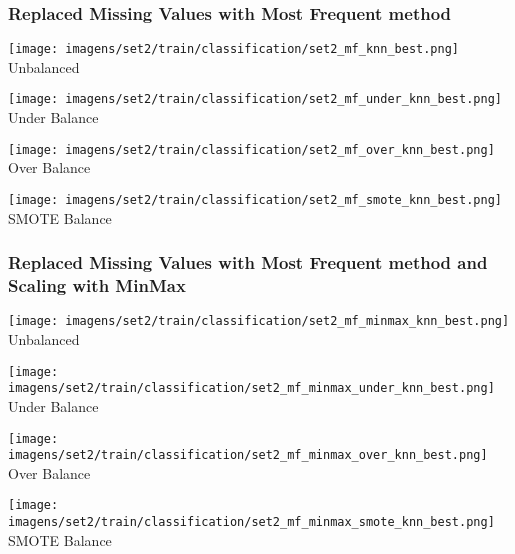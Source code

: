 \documentclass[11pt]{article}
\begin{document}
\subsubsection*{Replaced Missing Values with Most Frequent method}

\begin{figure*}[!htp]
    \begin{minipage}[!htp]{.25\textwidth}
        \centering
        \texttt{[image: imagens/set2/train/classification/set2\_mf\_knn\_best.png]}
        Unbalanced
    \end{minipage}\hfill
    \begin{minipage}[!htp]{.25\textwidth}
        \centering
        \texttt{[image: imagens/set2/train/classification/set2\_mf\_under\_knn\_best.png]}
        Under Balance
    \end{minipage}\hfill
    \begin{minipage}[!htp]{.25\textwidth}
        \centering
        \texttt{[image: imagens/set2/train/classification/set2\_mf\_over\_knn\_best.png]}
        Over Balance
    \end{minipage}\hfill
    \begin{minipage}[!htp]{.25\textwidth}
        \centering
        \texttt{[image: imagens/set2/train/classification/set2\_mf\_smote\_knn\_best.png]}
        SMOTE Balance
    \end{minipage}
\end{figure*}

\subsubsection*{Replaced Missing Values with Most Frequent method and Scaling with MinMax}

\begin{figure*}[!htp]
    \begin{minipage}[!htp]{.25\textwidth}
        \centering
        \texttt{[image: imagens/set2/train/classification/set2\_mf\_minmax\_knn\_best.png]}
        Unbalanced
    \end{minipage}\hfill
    \begin{minipage}[!htp]{.25\textwidth}
        \centering
        \texttt{[image: imagens/set2/train/classification/set2\_mf\_minmax\_under\_knn\_best.png]}
        Under Balance
    \end{minipage}\hfill
    \begin{minipage}[!htp]{.25\textwidth}
        \centering
        \texttt{[image: imagens/set2/train/classification/set2\_mf\_minmax\_over\_knn\_best.png]}
        Over Balance
    \end{minipage}\hfill
    \begin{minipage}[!htp]{.25\textwidth}
        \centering
        \texttt{[image: imagens/set2/train/classification/set2\_mf\_minmax\_smote\_knn\_best.png]}
        SMOTE Balance
    \end{minipage}
\end{figure*}
\end{document}
